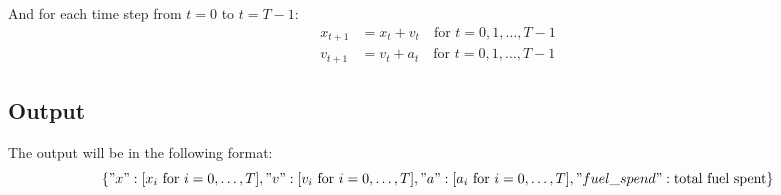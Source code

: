 \documentclass{article}
\begin{document}
And for each time step from \( t = 0 \) to \( t = T-1 \):
\begin{align*}
x_{t+1} &= x_t + v_t \quad \text{for } t = 0, 1, \ldots, T-1 \\
v_{t+1} &= v_t + a_t \quad \text{for } t = 0, 1, \ldots, T-1
\end{align*}

\subsection*{Output}
The output will be in the following format:
\[
\{
    "x": [x_i \text{ for } i = 0, \ldots, T],
    "v": [v_i \text{ for } i = 0, \ldots, T],
    "a": [a_i \text{ for } i = 0, \ldots, T],
    "fuel\_spend": \text{total fuel spent}
\}
\]
\end{document}
